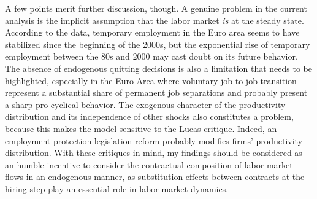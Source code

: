 \documentclass[a4paper]{article}
\begin{document}
A few points merit further discussion, though. A genuine problem in the current analysis is the implicit assumption that the labor market \emph{is} at the steady state. According to the data, temporary employment in the Euro area seems to have stabilized since the beginning of the 2000s, but the exponential rise of temporary employment between the 80s and 2000 may cast doubt on its future behavior. The absence of endogenous quitting decisions is also a limitation that needs to be highlighted, especially in the Euro Area where voluntary job-to-job transition represent a substantial share of permanent job separations and probably present a sharp pro-cyclical behavior. The exogenous character of the productivity distribution and its independence of other shocks also constitutes a problem, because this makes the model sensitive to the Lucas critique. Indeed, an employment protection legislation reform probably modifies firms' productivity distribution. With these critiques in mind, my findings should be considered as an humble incentive to consider the contractual composition of labor market flows in an endogenous manner, as substitution effects between contracts at the hiring step play an essential role in labor market dynamics.




\end{document}
